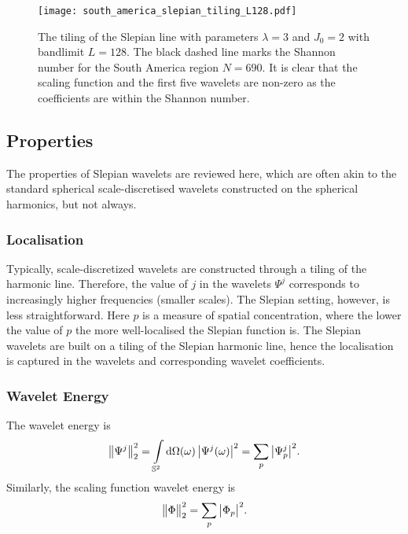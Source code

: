 \begin{figure}[htp]
	\centering
	\texttt{[image: south\_america\_slepian\_tiling\_L128.pdf]}
	\caption{
		The tiling of the Slepian line with parameters \(\lambda=3\) and \(J_{0}=2\) with bandlimit \(L=128\).
		The black dashed line marks the Shannon number for the South America region \(N=690\).
		It is clear that the scaling function and the first five wavelets are non-zero as the coefficients are within the Shannon number.
	}\label{fig:chapter3_tiling}
\end{figure}

\subsection{Properties}\label{sec:chapter3_properties}

The properties of Slepian wavelets are reviewed here, which are often akin to the standard spherical scale-discretised wavelets constructed on the spherical harmonics, but not always.

\subsubsection{Localisation}\label{sec:chapter3_localisation}

Typically, scale-discretized wavelets are constructed through a tiling of the harmonic line.
Therefore, the value of \(j\) in the wavelets \(\Psi^{j}\) corresponds to increasingly higher frequencies (smaller scales).
The Slepian setting, however, is less straightforward.
Here \(p\) is a measure of spatial concentration, where the lower the value of \(p\) the more well-localised the Slepian function is.
The Slepian wavelets are built on a tiling of the Slepian harmonic line, hence the localisation is captured in the wavelets and corresponding wavelet coefficients.

\subsubsection{Wavelet Energy}

The wavelet energy is
%
\begin{equation}
	{\big\lVert\Psi^{j}\big\rVert}_{2}^{2}
	= \int\limits_{\mathbb{S}^{2}} \dd{\Omega(\omega)} \big\lvert\Psi^{j}(\omega)\big\rvert^{2}
	= \sum\limits_{p} \big\lvert{\Psi}_{p}^{j}\big\rvert^{2}.
\end{equation}
%
Similarly, the scaling function wavelet energy is
%
\begin{equation}
	{\big\lVert\Phi\big\rVert}_{2}^{2}
	= \sum\limits_{p} \big\lvert{\Phi}_{p}\big\rvert^{2}.
\end{equation}

